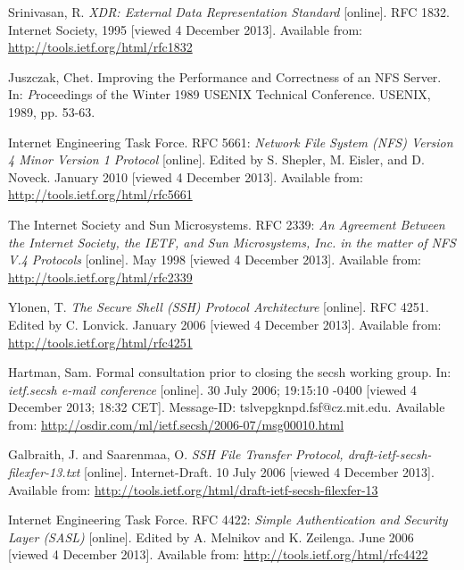 \begin{thebibliography}{99}
	{\sc Srinivasan,} R.
	\emph{XDR: External Data Representation Standard}
	[online].
	RFC 1832.
	Internet Society, 1995 [viewed 4 December 2013].
	Available from: \url{http://tools.ietf.org/html/rfc1832}

	{\sc Juszczak,} Chet.
	Improving the Performance and Correctness of an NFS Server.
	In: {\emph Proceedings of the Winter 1989 USENIX Technical Conference}.
	USENIX, 1989, pp. 53-63.

	{\sc Internet Engineering Task Force}.
	RFC 5661:
	\emph{Network File System (NFS) Version 4 Minor Version 1 Protocol}
	[online].
	Edited by S. Shepler, M. Eisler, and D. Noveck.
	January 2010 [viewed 4 December 2013].
	Available from: \url{http://tools.ietf.org/html/rfc5661}

	{\sc The Internet Society} and {\sc Sun Microsystems}.
	RFC 2339:
	\emph{An Agreement Between the Internet Society, the IETF, and Sun Microsystems, Inc. in the matter of NFS V.4 Protocols}
	[online].
	May 1998 [viewed 4 December 2013].
	Available from: \url{http://tools.ietf.org/html/rfc2339}

	{\sc Ylonen,} T.
	\emph{The Secure Shell (SSH) Protocol Architecture}
	[online].
	RFC 4251.
	Edited by C. Lonvick.
	January 2006 [viewed 4 December 2013].
	Available from: \url{http://tools.ietf.org/html/rfc4251}

	{\sc Hartman,} Sam.
	Formal consultation prior to closing the secsh working group.
	In: \emph{ietf.secsh e-mail conference}
	[online].
	30 July 2006; 19:15:10 -0400 [viewed 4 December 2013; 18:32 CET].
	Message-ID: tslvepgknpd.fsf@cz.mit.edu.
	Available from: \newline \url{http://osdir.com/ml/ietf.secsh/2006-07/msg00010.html}

	{\sc Galbraith,} J. and {\sc Saarenmaa,} O.
	\emph{SSH File Transfer Protocol, draft-ietf-secsh-filexfer-13.txt}
	[online].
	Internet-Draft.
	10 July 2006 [viewed 4 December 2013].
	Available from: \newline \url{http://tools.ietf.org/html/draft-ietf-secsh-filexfer-13}


	{\sc Internet Engineering Task Force}.
	RFC 4422:
	\emph{Simple Authentication and Security Layer (SASL)}
	[online].
	Edited by A. Melnikov and K. Zeilenga.
	June 2006 [viewed 4 December 2013].
	Available from: \newline \url{http://tools.ietf.org/html/rfc4422}


\end{thebibliography}
